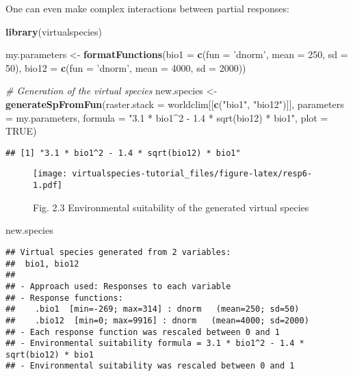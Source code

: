 \documentclass[]{article}
\newenvironment{Shaded}{\begin{snugshade}}{\end{snugshade}}
\newcommand{\KeywordTok}[1]{\textcolor[rgb]{0.13,0.29,0.53}{\textbf{#1}}}
\newcommand{\DataTypeTok}[1]{\textcolor[rgb]{0.13,0.29,0.53}{#1}}
\newcommand{\DecValTok}[1]{\textcolor[rgb]{0.00,0.00,0.81}{#1}}
\newcommand{\StringTok}[1]{\textcolor[rgb]{0.31,0.60,0.02}{#1}}
\newcommand{\CommentTok}[1]{\textcolor[rgb]{0.56,0.35,0.01}{\textit{#1}}}
\newcommand{\OtherTok}[1]{\textcolor[rgb]{0.56,0.35,0.01}{#1}}
\newcommand{\NormalTok}[1]{#1}
\begin{document}
One can even make complex interactions between partial responses:

\begin{Shaded}
\begin{Highlighting}[]
\KeywordTok{library}\NormalTok{(virtualspecies)}

\NormalTok{my.parameters <-}\StringTok{ }\KeywordTok{formatFunctions}\NormalTok{(}\DataTypeTok{bio1 =} \KeywordTok{c}\NormalTok{(}\DataTypeTok{fun =} \StringTok{'dnorm'}\NormalTok{, }\DataTypeTok{mean =} \DecValTok{250}\NormalTok{, }\DataTypeTok{sd =} \DecValTok{50}\NormalTok{),}
                                 \DataTypeTok{bio12 =} \KeywordTok{c}\NormalTok{(}\DataTypeTok{fun =} \StringTok{'dnorm'}\NormalTok{, }\DataTypeTok{mean =} \DecValTok{4000}\NormalTok{, }\DataTypeTok{sd =} \DecValTok{2000}\NormalTok{))}

\CommentTok{# Generation of the virtual species}
\NormalTok{new.species <-}\StringTok{ }\KeywordTok{generateSpFromFun}\NormalTok{(}\DataTypeTok{raster.stack =}\NormalTok{ worldclim[[}\KeywordTok{c}\NormalTok{(}\StringTok{"bio1"}\NormalTok{, }\StringTok{"bio12"}\NormalTok{)]],}
                                 \DataTypeTok{parameters =}\NormalTok{ my.parameters,}
                                 \DataTypeTok{formula =} \StringTok{"3.1 * bio1^2 - 1.4 * sqrt(bio12) * bio1"}\NormalTok{,}
                                 \DataTypeTok{plot =} \OtherTok{TRUE}\NormalTok{)}
\end{Highlighting}
\end{Shaded}

\begin{verbatim}
## [1] "3.1 * bio1^2 - 1.4 * sqrt(bio12) * bio1"
\end{verbatim}

\begin{figure}
\centering
\texttt{[image: virtualspecies-tutorial\_files/figure-latex/resp6-1.pdf]}
\caption{Fig. 2.3 Environmental suitability of the generated virtual
species}
\end{figure}

\begin{Shaded}
\begin{Highlighting}[]
\NormalTok{new.species}
\end{Highlighting}
\end{Shaded}

\begin{verbatim}
## Virtual species generated from 2 variables:
##  bio1, bio12
## 
## - Approach used: Responses to each variable
## - Response functions:
##    .bio1  [min=-269; max=314] : dnorm   (mean=250; sd=50)
##    .bio12  [min=0; max=9916] : dnorm   (mean=4000; sd=2000)
## - Each response function was rescaled between 0 and 1
## - Environmental suitability formula = 3.1 * bio1^2 - 1.4 * sqrt(bio12) * bio1
## - Environmental suitability was rescaled between 0 and 1
\end{verbatim}
\end{document}
